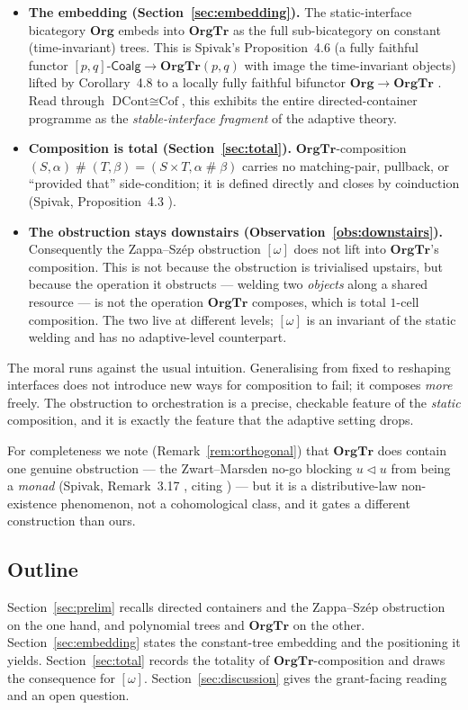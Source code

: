 \documentclass[11pt]{amsart}
\theoremstyle{definition}
\theoremstyle{remark}
\newcommand{\OrgTr}{\mathbf{OrgTr}}
\newcommand{\Org}{\mathbf{Org}}
\newcommand{\Coalg}{\text{-}\mathsf{Coalg}}
\newcommand{\seq}{\triangleleft}
\begin{document}
\begin{itemize}
  \item \textbf{The embedding (Section~\ref{sec:embedding}).} The static-interface
    bicategory $\Org$ embeds into $\OrgTr$ as the full sub-bicategory on constant
    (time-invariant) trees. This is Spivak's Proposition~4.6 (a fully faithful functor
    $[p,q]\Coalg\to\OrgTr(p,q)$ with image the time-invariant objects) lifted by
    Corollary~4.8 to a locally fully faithful bifunctor $\Org\to\OrgTr$
    \cite{SpivakOrgTr}. Read through $\text{DCont}\cong\text{Cof}$, this exhibits the
    entire directed-container programme as the \emph{stable-interface fragment} of the
    adaptive theory.
  \item \textbf{Composition is total (Section~\ref{sec:total}).} $\OrgTr$-composition
    $(S,\alpha)\mathbin{\#}(T,\beta)=(S\times T,\alpha\mathbin{\#}\beta)$ carries no
    matching-pair, pullback, or ``provided that'' side-condition; it is defined directly
    and closes by coinduction (Spivak, Proposition~4.3 \cite{SpivakOrgTr}).
  \item \textbf{The obstruction stays downstairs (Observation~\ref{obs:downstairs}).}
    Consequently the Zappa--Szép obstruction $[\omega]$ does not lift into $\OrgTr$'s
    composition. This is not because the obstruction is trivialised upstairs, but because
    the operation it obstructs --- welding two \emph{objects} along a shared resource ---
    is not the operation $\OrgTr$ composes, which is total $1$-cell composition. The two
    live at different levels; $[\omega]$ is an invariant of the static welding and has no
    adaptive-level counterpart.
\end{itemize}

The moral runs against the usual intuition. Generalising from fixed to reshaping
interfaces does not introduce new ways for composition to fail; it composes \emph{more}
freely. The obstruction to orchestration is a precise, checkable feature of the
\emph{static} composition, and it is exactly the feature that the adaptive setting drops.

For completeness we note (Remark~\ref{rem:orthogonal}) that $\OrgTr$ does contain one
genuine obstruction --- the Zwart--Marsden no-go blocking $u\seq u$ from being a
\emph{monad} (Spivak, Remark~3.17 \cite{SpivakOrgTr}, citing \cite{ZwartMarsden}) --- but
it is a distributive-law non-existence phenomenon, not a cohomological class, and it gates
a different construction than ours.

\subsection*{Outline}
Section~\ref{sec:prelim} recalls directed containers and the Zappa--Szép obstruction on
the one hand, and polynomial trees and $\OrgTr$ on the other. Section~\ref{sec:embedding}
states the constant-tree embedding and the positioning it yields. Section~\ref{sec:total}
records the totality of $\OrgTr$-composition and draws the consequence for $[\omega]$.
Section~\ref{sec:discussion} gives the grant-facing reading and an open question.
\end{document}

